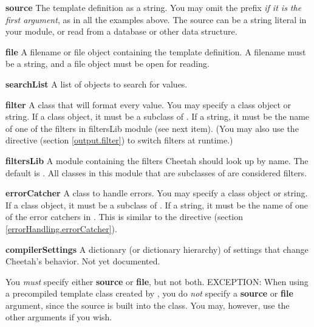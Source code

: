 \begin{description}
\item{{\bf source}}
     The template definition as a string.  You may omit the 
     prefix {\em if it is the first argument}, as in all the examples above.
     The source can be a string literal in your module, or read from a database
     or other data structure.
\item{{\bf file}}
     A filename or file object containing the template definition.
     A filename must be a string, and a file object must be open for reading.
\item{{\bf searchList}}
     A list of objects to search for  values.
\item{{\bf filter}}
     A class that will format every  value.  You may
     specify a class object or string.  If a class object,
     it must be a subclass of .  If a string, it
     must be the name of one of the filters in filtersLib module (see next 
     item).
     (You may also use the  directive (section
     \ref{output.filter}) to switch filters at runtime.)
\item{{\bf filtersLib}}
     A module containing the filters Cheetah should look up by name.  The
     default is .  All classes in this module that are
     subclasses of  are considered filters.
\item{{\bf errorCatcher}}
     A class to handle  errors.  You may
     specify a class object or string.  If a class object,
     it must be a subclass of .  
     If a string, it must be the name of one of the error catchers in
     .  This is similar to the 
      directive 
     (section \ref{errorHandling.errorCatcher}).
\item{{\bf compilerSettings}}
     A dictionary (or dictionary hierarchy) of settings that change Cheetah's
     behavior.  Not yet documented.
\end{description}

You {\em must} specify either {\bf source} or {\bf file}, but not both.  
EXCEPTION: When using a precompiled template class created by
, you do {\em not} specify a {\bf source} or {\bf
file} argument, since the source is built into the class.  You may, however,
use the other arguments if you wish.

